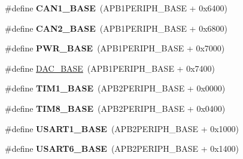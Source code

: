 \begin{DoxyCompactItemize}
\item 
\hypertarget{group___peripheral__memory__map_gad8e45ea6c032d9fce1b0516fff9d8eaa}{\#define {\bfseries C\-A\-N1\-\_\-\-B\-A\-S\-E}~(A\-P\-B1\-P\-E\-R\-I\-P\-H\-\_\-\-B\-A\-S\-E + 0x6400)}\label{group___peripheral__memory__map_gad8e45ea6c032d9fce1b0516fff9d8eaa}

\item 
\hypertarget{group___peripheral__memory__map_gaf7b8267b0d439f8f3e82f86be4b9fba1}{\#define {\bfseries C\-A\-N2\-\_\-\-B\-A\-S\-E}~(A\-P\-B1\-P\-E\-R\-I\-P\-H\-\_\-\-B\-A\-S\-E + 0x6800)}\label{group___peripheral__memory__map_gaf7b8267b0d439f8f3e82f86be4b9fba1}

\item 
\hypertarget{group___peripheral__memory__map_gac691ec23dace8b7a649a25acb110217a}{\#define {\bfseries P\-W\-R\-\_\-\-B\-A\-S\-E}~(A\-P\-B1\-P\-E\-R\-I\-P\-H\-\_\-\-B\-A\-S\-E + 0x7000)}\label{group___peripheral__memory__map_gac691ec23dace8b7a649a25acb110217a}

\item 
\#define \hyperlink{group___peripheral__memory__map_gad18d0b914c7f68cecbee1a2d23a67d38}{D\-A\-C\-\_\-\-B\-A\-S\-E}~(A\-P\-B1\-P\-E\-R\-I\-P\-H\-\_\-\-B\-A\-S\-E + 0x7400)
\item 
\hypertarget{group___peripheral__memory__map_gaf8aa324ca5011b8173ab16585ed7324a}{\#define {\bfseries T\-I\-M1\-\_\-\-B\-A\-S\-E}~(A\-P\-B2\-P\-E\-R\-I\-P\-H\-\_\-\-B\-A\-S\-E + 0x0000)}\label{group___peripheral__memory__map_gaf8aa324ca5011b8173ab16585ed7324a}

\item 
\hypertarget{group___peripheral__memory__map_ga5b72f698b7a048a6f9fcfe2efe5bc1db}{\#define {\bfseries T\-I\-M8\-\_\-\-B\-A\-S\-E}~(A\-P\-B2\-P\-E\-R\-I\-P\-H\-\_\-\-B\-A\-S\-E + 0x0400)}\label{group___peripheral__memory__map_ga5b72f698b7a048a6f9fcfe2efe5bc1db}

\item 
\hypertarget{group___peripheral__memory__map_ga86162ab3f740db9026c1320d46938b4d}{\#define {\bfseries U\-S\-A\-R\-T1\-\_\-\-B\-A\-S\-E}~(A\-P\-B2\-P\-E\-R\-I\-P\-H\-\_\-\-B\-A\-S\-E + 0x1000)}\label{group___peripheral__memory__map_ga86162ab3f740db9026c1320d46938b4d}

\item 
\hypertarget{group___peripheral__memory__map_gade4d3907fd0387ee832f426f52d568bb}{\#define {\bfseries U\-S\-A\-R\-T6\-\_\-\-B\-A\-S\-E}~(A\-P\-B2\-P\-E\-R\-I\-P\-H\-\_\-\-B\-A\-S\-E + 0x1400)}\label{group___peripheral__memory__map_gade4d3907fd0387ee832f426f52d568bb}


\end{DoxyCompactItemize}
